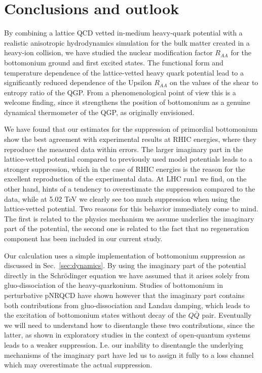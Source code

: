 
\section{Conclusions and outlook}
\label{sec:con}

By combining a lattice QCD vetted in-medium heavy-quark potential with a realistic anisotropic hydrodynamics simulation for the bulk matter created in a heavy-ion collision, we have studied the nuclear modification factor $R_{AA}$ for the bottomonium ground and first excited states. 
The functional form and temperature dependence of the lattice-vetted heavy quark potential lead to a significantly reduced dependence of the Upsilon $R_{AA}$ on the values of the shear to entropy ratio of the QGP. From a phenomenological point of view this is a welcome finding, since it strengthens the position of bottomonium as a genuine dynamical thermometer of the QGP, as originally envisioned.

We have found that our estimates for the suppression of primordial bottomonium show the best agreement with experimental results at RHIC energies, where they reproduce the measured data within errors. The larger imaginary part in the lattice-vetted potential compared to previously used model potentials leads to a stronger suppression, which in the case of RHIC energies is the reason for the excellent reproduction of the experimental data. At LHC run1 we find, on the other hand, hints of a tendency to overestimate the suppression compared to the data, while at 5.02 TeV we clearly see too much suppression when using the lattice-vetted potential. Two reasons for this behavior immediately come to mind. The first is related to the physics mechanism we assume underlies the imaginary part of the potential, the second one is related to the fact that no regeneration component has been included in our current study.

Our calculation uses a simple implementation of bottomonium suppression as discussed in Sec.~\ref{sec:dynamics}. By using the imaginary part of the potential directly in the Schr\"odinger equation we have assumed that it arises solely from gluo-dissociation of the heavy-quarkonium. Studies of bottomonium in perturbative pNRQCD have shown however that the imaginary part contains both contributions from gluo-dissociation and Landau damping, which leads to the excitation of bottomonium states without decay of the $Q\bar{Q}$ pair. Eventually we will need to understand how to disentangle these two contributions, since the latter, as shown in exploratory studies in the context of open-quantum systems  \cite{Rothkopf:2013kya,Kajimoto:2017rel} leads to a weaker suppression. I.e. our inability to disentangle the underlying mechanisms of the imaginary part have led us to assign it fully to a loss channel which may overestimate the actual suppression.

